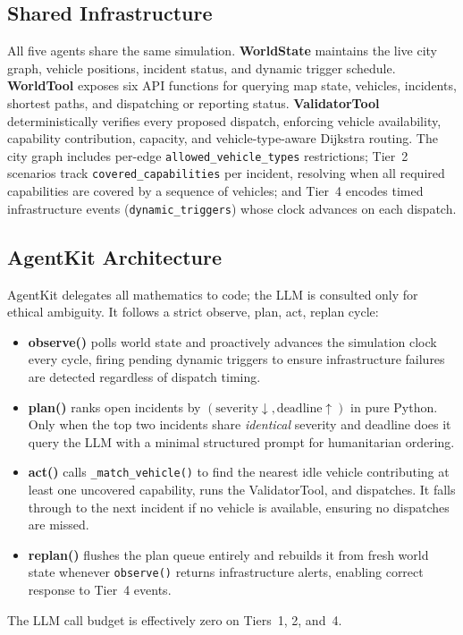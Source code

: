\documentclass{article}
\begin{document}
\subsection{Shared Infrastructure}

All five agents share the same simulation. \textbf{WorldState} maintains the
live city graph, vehicle positions, incident status, and dynamic trigger
schedule. \textbf{WorldTool} exposes six API functions for querying map state,
vehicles, incidents, shortest paths, and dispatching or reporting status.
\textbf{ValidatorTool} deterministically verifies every proposed dispatch,
enforcing vehicle availability, capability contribution, capacity, and
vehicle-type-aware Dijkstra routing. The city graph includes per-edge
\texttt{allowed\_vehicle\_types} restrictions; Tier~2 scenarios track
\texttt{covered\_capabilities} per incident, resolving when all required
capabilities are covered by a sequence of vehicles; and Tier~4 encodes timed
infrastructure events (\texttt{dynamic\_triggers}) whose clock advances on
each dispatch.

\subsection{AgentKit Architecture}
\label{sec:agentkit}

AgentKit delegates all mathematics to code; the LLM is consulted only for
ethical ambiguity. It follows a strict observe, plan, act, replan cycle:
\begin{itemize}
  \item \textbf{observe()} polls world state and proactively advances the
    simulation clock every cycle, firing pending dynamic triggers to ensure
    infrastructure failures are detected regardless of dispatch timing.
  \item \textbf{plan()} ranks open incidents by
    $(\text{severity}{\downarrow}, \text{deadline}{\uparrow})$ in pure Python.
    Only when the top two incidents share \emph{identical} severity and
    deadline does it query the LLM with a minimal structured prompt for
    humanitarian ordering.
  \item \textbf{act()} calls \texttt{\_match\_vehicle()} to find the nearest
    idle vehicle contributing at least one uncovered capability, runs the
    ValidatorTool, and dispatches. It falls through to the next incident if no
    vehicle is available, ensuring no dispatches are missed.
  \item \textbf{replan()} flushes the plan queue entirely and rebuilds it from
    fresh world state whenever \texttt{observe()} returns infrastructure alerts,
    enabling correct response to Tier~4 events.
\end{itemize}
The LLM call budget is effectively zero on Tiers~1, 2, and~4.
\end{document}
